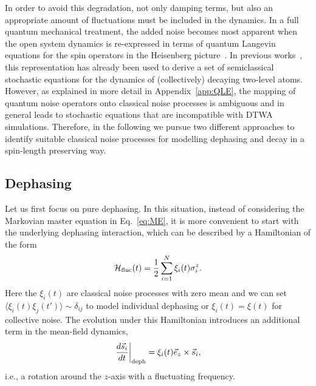 \documentclass[pra,twocolumn,showpacs,preprintnumbers,amsmath,amssymb,superscriptaddress]{revtex4-1}
\begin{document}
In order to avoid this degradation, not only damping terms, but also an appropriate amount of fluctuations must be included in the dynamics. 
In a full quantum mechanical treatment, the added noise becomes most apparent when the open system dynamics is re-expressed in terms of quantum Langevin equations for the spin operators in the Heisenberg picture~\cite{WallsMilburn,GardinerZoller}. In previous works~\cite{Liu2020,Jaeger2021}, this representation has already been used to derive a set of semiclassical stochastic equations for the dynamics of (collectively) decaying two-level atoms. However, as explained in more detail in Appendix~\ref{app:QLE},  the mapping of quantum noise operators onto classical noise processes is ambiguous and in general leads to stochastic equations that are incompatible with DTWA simulations. Therefore, in the following we pursue two different approaches to identify suitable classical noise processes for modelling dephasing and decay in a spin-length preserving way.




\subsection{Dephasing} 
Let us first focus on pure dephasing. 
In this situation, instead of considering the Markovian master equation in Eq.~\eqref{eq:ME}, it is more convenient to start with the underlying dephasing interaction, which can be described by a  Hamiltonian of the form
\begin{equation}\label{eq:HamNoise}
\mathcal{H}_{\rm fluc}(t)= \frac{1}{2}\sum_{i=1}^N \xi_i(t) \sigma_i^z.
\end{equation}
Here the $\xi_i(t)$ are classical noise processes with zero mean and we can set $\langle \xi_i(t)\xi_j(t')\rangle\sim \delta_{ij} $ to model individual dephasing or $\xi_i(t)=\xi(t)$ for collective noise. The evolution under this Hamiltonian introduces an additional term in the mean-field dynamics,
\begin{equation}\label{eq:Stratonovich}
\left.\frac{d\vec s_i}{dt}\right|_{\rm deph}=  \xi_i(t) \vec e_z\times \vec s_i,
\end{equation}
i.e., a rotation around the $z$-axis with a fluctuating frequency.
\end{document}
